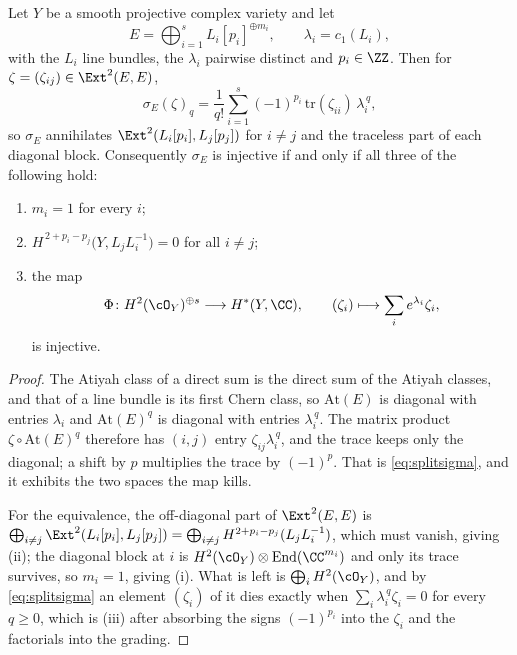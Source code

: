 \begin{lemma}\label{lem:splitsemireg}
Let $Y$ be a smooth projective complex variety and let
\[
  E=\bigoplus_{i=1}^{s}L_{i}[p_{i}]^{\oplus m_{i}},
  \qquad \lambda_{i}=c_{1}(L_{i}),
\]
with the $L_{i}$ line bundles, the $\lambda_{i}$ pairwise distinct and
$p_{i}\in\ZZ$. Then for $\zeta=(\zeta_{ij})\in\Ext^{2}(E,E)$,
\begin{equation}\label{eq:splitsigma}
  \sigma_{E}(\zeta)_{q}
  =\frac{1}{q!}\sum_{i=1}^{s}(-1)^{p_{i}}\,
    \mathrm{tr}(\zeta_{ii})\,\lambda_{i}^{\,q},
\end{equation}
so $\sigma_{E}$ annihilates $\Ext^{2}(L_{i}[p_{i}],L_{j}[p_{j}])$ for $i\ne j$
and the traceless part of each diagonal block. Consequently $\sigma_{E}$ is
injective if and only if all three of the following hold:
\begin{enumerate}[label=\textup{(\roman*)},nosep]
\item $m_{i}=1$ for every $i$;
\item $H^{\,2+p_{i}-p_{j}}\bigl(Y,L_{j}L_{i}^{-1}\bigr)=0$ for all $i\ne j$;
\item the map
  \[
    \Phi\colon H^{2}(\cO_{Y})^{\oplus s}\longrightarrow H^{*}(Y,\CC),
    \qquad
    (\zeta_{i})\longmapsto\sum_{i}e^{\lambda_{i}}\zeta_{i},
  \]
  is injective.
\end{enumerate}
\end{lemma}

\begin{proof}
The Atiyah class of a direct sum is the direct sum of the Atiyah classes, and
that of a line bundle is its first Chern class, so $\mathrm{At}(E)$ is
diagonal with entries $\lambda_{i}$ and $\mathrm{At}(E)^{q}$ is diagonal with
entries $\lambda_{i}^{\,q}$. The matrix product $\zeta\circ\mathrm{At}(E)^{q}$
therefore has $(i,j)$ entry $\zeta_{ij}\lambda_{i}^{\,q}$, and the trace keeps
only the diagonal; a shift by $p$ multiplies the trace by $(-1)^{p}$. That is
\eqref{eq:splitsigma}, and it exhibits the two spaces the map kills.

For the equivalence, the off-diagonal part of $\Ext^{2}(E,E)$ is
$\bigoplus_{i\ne j}\Ext^{2}(L_{i}[p_{i}],L_{j}[p_{j}])
=\bigoplus_{i\ne j}H^{2+p_{i}-p_{j}}(L_{j}L_{i}^{-1})$, which must vanish,
giving (ii); the diagonal block at $i$ is $H^{2}(\cO_{Y})\otimes
\mathrm{End}(\CC^{m_{i}})$ and only its trace survives, so $m_{i}=1$, giving
(i). What is left is $\bigoplus_{i}H^{2}(\cO_{Y})$, and by
\eqref{eq:splitsigma} an element $(\zeta_{i})$ of it dies exactly when
$\sum_{i}\lambda_{i}^{\,q}\zeta_{i}=0$ for every $q\ge0$, which is (iii) after
absorbing the signs $(-1)^{p_{i}}$ into the $\zeta_{i}$ and the factorials
into the grading.
\end{proof}

